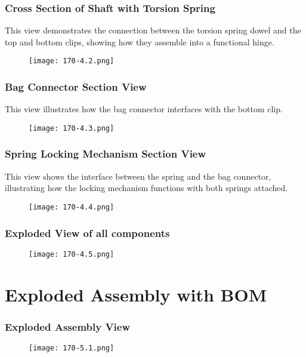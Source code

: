 \documentclass[12pt]{article}
\theoremstyle{definition} %
\theoremstyle{plain} %
\begin{document}
\subsubsection*{Cross Section of Shaft with Torsion Spring}
This view demonstrates the
connection between the torsion spring
dowel and the top and bottom clips,
showing how they assemble into a
functional hinge.
\begin{figure}[htbp]
  \centering
  \texttt{[image: 170-4.2.png]}
  \caption{}
  \label{fig:}
\end{figure}
\pagebreak
\subsubsection*{Bag Connector Section View}
This view illustrates how the bag connector interfaces with the bottom clip.
\begin{figure}[htbp]
  \centering
  \texttt{[image: 170-4.3.png]}
  \caption{}
  \label{fig:}
\end{figure}
\subsubsection*{Spring Locking Mechanism Section View}
This view shows the interface between the spring and the bag connector,
illustrating how the locking mechanism functions with both springs attached.
\begin{figure}[htbp]
  \centering
  \texttt{[image: 170-4.4.png]}
  \caption{}
  \label{fig:}
\end{figure}
\pagebreak
\subsubsection*{Exploded View of all components}
\begin{figure}[htbp]
  \centering
  \texttt{[image: 170-4.5.png]}
  \caption{}
  \label{fig:}
\end{figure}
\pagebreak

\section{Exploded Assembly with BOM}
\subsubsection*{Exploded Assembly View}
\begin{figure}[htbp]
  \centering
  \texttt{[image: 170-5.1.png]}
  \caption{}
  \label{fig:}
\end{figure}
\pagebreak
\end{document}
